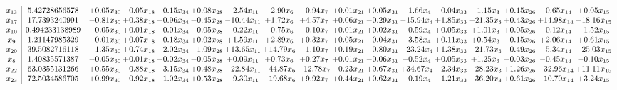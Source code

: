 \documentclass[9pt]{article}
\begin{document}
 \[\begin{array}{c| c c@{\hskip 2pt} c@{\hskip 2pt} c@{\hskip 2pt} c@{\hskip 2pt} c@{\hskip 2pt} c@{\hskip 2pt} c@{\hskip 2pt} c@{\hskip 2pt} c@{\hskip 2pt} c@{\hskip 2pt} c@{\hskip 2pt} c@{\hskip 2pt} c@{\hskip 2pt} c@{\hskip 2pt} c@{\hskip 2pt} }
 x_{13}   &  5.42728656578 & +  0.05 x_{30} & -0.05 x_{18} & -0.15 x_{34} & +  0.08 x_{28} & -2.54 x_{11} & -2.90 x_{6} & -0.94 x_{7} & +  0.01 x_{21} & +  0.05 x_{31} & +  1.66 x_{4} & -0.04 x_{33} & -1.15 x_{3} & +  0.15 x_{26} & -0.65 x_{14} & +  0.05 x_{15}\\
 x_{17}   &  17.7393240991 & -0.81 x_{30} & +  0.38 x_{18} & +  0.96 x_{34} & -0.45 x_{28} & -10.44 x_{11} & +  1.72 x_{6} & +  4.57 x_{7} & +  0.06 x_{21} & -0.29 x_{31} & -15.94 x_{4} & +  1.85 x_{33} & + 21.35 x_{3} & +  0.43 x_{26} & + 14.98 x_{14} & -18.16 x_{15}\\
 x_{10}   &  0.494233138989 & -0.05 x_{30} & +  0.01 x_{18} & +  0.01 x_{34} & -0.05 x_{28} & -0.22 x_{11} & -0.75 x_{6} & -0.10 x_{7} & +  0.01 x_{21} & +  0.02 x_{31} & +  0.59 x_{4} & +  0.05 x_{33} & +  1.01 x_{3} & +  0.05 x_{26} & -0.12 x_{14} & -1.52 x_{15}\\
 x_{9}   &  1.21147985329 & -0.01 x_{30} & +  0.07 x_{18} & +  0.18 x_{34} & +  0.02 x_{28} & +  1.59 x_{11} & +  2.89 x_{6} & +  0.32 x_{7} & +  0.05 x_{21} & -0.04 x_{31} & -3.58 x_{4} & +  0.11 x_{33} & +  0.54 x_{3} & -0.15 x_{26} & +  2.06 x_{14} & +  0.61 x_{15}\\
 x_{20}   &  39.5082716118 & -1.35 x_{30} & +  0.74 x_{18} & +  2.02 x_{34} & -1.09 x_{28} & + 13.65 x_{11} & + 14.79 x_{6} & -1.10 x_{7} & +  0.19 x_{21} & -0.80 x_{31} & -23.24 x_{4} & +  1.38 x_{33} & + 21.73 x_{3} & -0.49 x_{26} & -5.34 x_{14} & -25.03 x_{15}\\
 x_{8}   &  1.40835571387 & -0.05 x_{30} & +  0.01 x_{18} & +  0.02 x_{34} & -0.05 x_{28} & +  0.09 x_{11} & +  0.73 x_{6} & +  0.27 x_{7} & +  0.01 x_{21} & -0.06 x_{31} & -0.52 x_{4} & +  0.05 x_{33} & +  1.25 x_{3} & -0.03 x_{26} & -0.45 x_{14} & -0.10 x_{15}\\
 x_{22}   &  63.0355131266 & +  0.55 x_{30} & -0.88 x_{18} & -3.15 x_{34} & +  0.48 x_{28} & -22.84 x_{11} & -44.87 x_{6} & -12.78 x_{7} & -0.23 x_{21} & +  0.67 x_{31} & + 34.67 x_{4} & -2.34 x_{33} & -28.23 x_{3} & +  1.26 x_{26} & -32.96 x_{14} & + 11.11 x_{15}\\
 x_{23}   &  72.5034586705 & +  0.99 x_{30} & -0.92 x_{18} & -1.02 x_{34} & +  0.53 x_{28} & -9.30 x_{11} & -19.68 x_{6} & +  9.92 x_{7} & +  0.44 x_{21} & +  0.62 x_{31} & -0.19 x_{4} & -1.21 x_{33} & -36.20 x_{3} & +  0.61 x_{26} & -10.70 x_{14} & +  3.24 x_{15}\\

\end{array}\]
\end{document}
